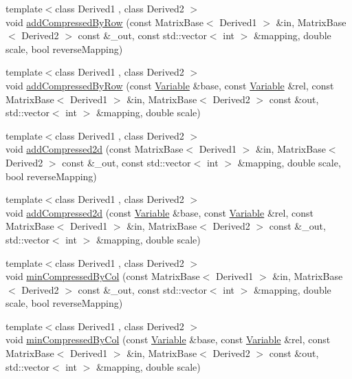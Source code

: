 \begin{DoxyCompactItemize}
\item 
{\footnotesize template$<$class Derived1 , class Derived2 $>$ }\\void \hyperlink{namespaceocra_1_1utils_a8256ba2ed6ce4d6066c03631e64e27f9}{add\+Compressed\+By\+Row} (const Matrix\+Base$<$ Derived1 $>$ \&in, Matrix\+Base$<$ Derived2 $>$ const \&\+\_\+out, const std\+::vector$<$ int $>$ \&mapping, double scale, bool reverse\+Mapping)
\item 
{\footnotesize template$<$class Derived1 , class Derived2 $>$ }\\void \hyperlink{namespaceocra_1_1utils_a0ca59cf5c0fd0b8e92a0aa53d85e0aca}{add\+Compressed\+By\+Row} (const \hyperlink{classocra_1_1Variable}{Variable} \&base, const \hyperlink{classocra_1_1Variable}{Variable} \&rel, const Matrix\+Base$<$ Derived1 $>$ \&in, Matrix\+Base$<$ Derived2 $>$ const \&out, std\+::vector$<$ int $>$ \&mapping, double scale)
\item 
{\footnotesize template$<$class Derived1 , class Derived2 $>$ }\\void \hyperlink{namespaceocra_1_1utils_ad4dfd96e7620a1cadabe53db0cdf969d}{add\+Compressed2d} (const Matrix\+Base$<$ Derived1 $>$ \&in, Matrix\+Base$<$ Derived2 $>$ const \&\+\_\+out, const std\+::vector$<$ int $>$ \&mapping, double scale, bool reverse\+Mapping)
\item 
{\footnotesize template$<$class Derived1 , class Derived2 $>$ }\\void \hyperlink{namespaceocra_1_1utils_af486ff6d7c311e33a0c7d647eb45bcd6}{add\+Compressed2d} (const \hyperlink{classocra_1_1Variable}{Variable} \&base, const \hyperlink{classocra_1_1Variable}{Variable} \&rel, const Matrix\+Base$<$ Derived1 $>$ \&in, Matrix\+Base$<$ Derived2 $>$ const \&\+\_\+out, std\+::vector$<$ int $>$ \&mapping, double scale)
\item 
{\footnotesize template$<$class Derived1 , class Derived2 $>$ }\\void \hyperlink{namespaceocra_1_1utils_ab527c3744d4c3ca93750164c91a9c3dd}{min\+Compressed\+By\+Col} (const Matrix\+Base$<$ Derived1 $>$ \&in, Matrix\+Base$<$ Derived2 $>$ const \&\+\_\+out, const std\+::vector$<$ int $>$ \&mapping, double scale, bool reverse\+Mapping)
\item 
{\footnotesize template$<$class Derived1 , class Derived2 $>$ }\\void \hyperlink{namespaceocra_1_1utils_aa4b4cd7a5d18ae426d5aa2fb46d20902}{min\+Compressed\+By\+Col} (const \hyperlink{classocra_1_1Variable}{Variable} \&base, const \hyperlink{classocra_1_1Variable}{Variable} \&rel, const Matrix\+Base$<$ Derived1 $>$ \&in, Matrix\+Base$<$ Derived2 $>$ const \&out, std\+::vector$<$ int $>$ \&mapping, double scale)

\end{DoxyCompactItemize}
